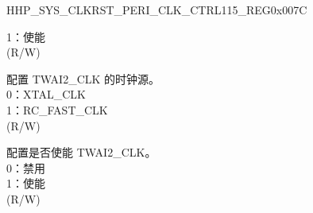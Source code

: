 \begin{register}{H}{HP\_SYS\_CLKRST\_PERI\_CLK\_CTRL115\_REG}{0x007C}
\begin{regdesc}
\begin{reglist}
1：使能\\(R/W)
\label{fielddesc:HPSYSCLKRSTTWAI2CLKSRCSEL}\item [HP\_SYS\_CLKRST\_TWAI2\_CLK\_SRC\_SEL] 配置 TWAI2\_CLK 的时钟源。\\0：XTAL\_CLK\\ 1：RC\_FAST\_CLK\\ (R/W)
\label{fielddesc:HPSYSCLKRSTTWAI2CLKEN}\item [HP\_SYS\_CLKRST\_TWAI2\_CLK\_EN] 配置是否使能 TWAI2\_CLK。\\
0：禁用\\
1：使能\\(R/W)
\end{reglist}\end{regdesc}
\end{register}


